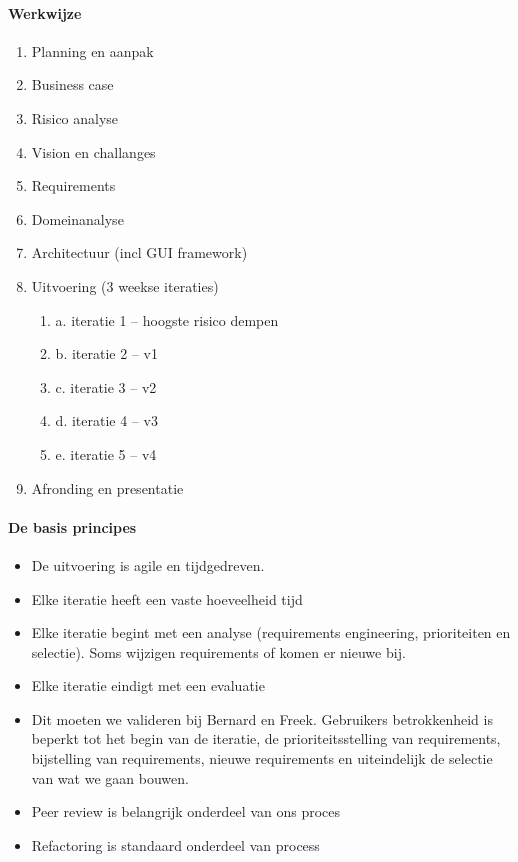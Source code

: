 
\paragraph{Werkwijze}


\begin{enumerate}
 \item Planning en aanpak
 \item Business case
 \item Risico analyse
 \item Vision en challanges
 \item Requirements
 \item Domeinanalyse
 \item Architectuur (incl GUI framework)
 \item Uitvoering (3 weekse iteraties)
 \begin{enumerate}
  \item a. iteratie 1 -- hoogste risico dempen
  \item b. iteratie 2 -- v1
  \item c. iteratie 3 -- v2
  \item d. iteratie 4 -- v3
  \item e. iteratie 5 -- v4
 \end{enumerate}
\item Afronding en presentatie
\end{enumerate}

\paragraph{De basis principes}
\begin{itemize}
 \item De uitvoering is agile en tijdgedreven.
 \item Elke iteratie heeft een vaste hoeveelheid tijd
 \item Elke iteratie begint met een analyse (requirements engineering, prioriteiten en selectie). Soms wijzigen requirements of komen er nieuwe bij.
 \item Elke iteratie eindigt met een evaluatie
 \item Dit moeten we valideren bij Bernard en Freek. Gebruikers betrokkenheid is
 beperkt tot het begin van de iteratie, de prioriteitsstelling van requirements, bijstelling van
 requirements, nieuwe requirements en uiteindelijk de selectie van wat we gaan bouwen.
 \item Peer review is belangrijk onderdeel van ons proces
 \item Refactoring is standaard onderdeel van process
\end{itemize}

